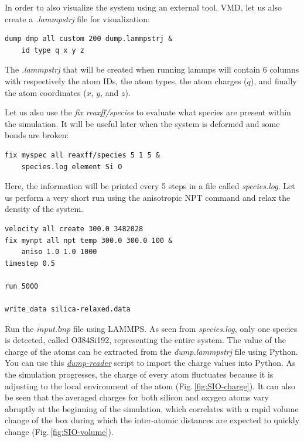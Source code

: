 \documentclass[9pt,tutorial]{livecoms}
\begin{document}
In order to also visualize the system using an external tool, VMD, let us also
create a \textit{.lammpstrj} file for visualization:
{\normalsize \begin{verbatim}
dump dmp all custom 200 dump.lammpstrj &
    id type q x y z
\end{verbatim}}
The \textit{.lammpstrj} that will be created when running lammps will contain
6 columns with respectively the atom IDs, the atom types, the atom charges ($q$),
and finally the atom coordinates ($x$, $y$, and $z$).

Let us also use the \textit{fix reaxff/species} to evaluate what species are
present within the simulation. It will be useful later when the system is deformed
and some bonds are broken:
{\normalsize \begin{verbatim}
fix myspec all reaxff/species 5 1 5 &
    species.log element Si O
\end{verbatim}}
Here, the information will be printed every 5 steps in a file called \textit{species.log}.
Let us perform a very short run using the anisotropic NPT command and relax the
density of the system.
{\normalsize \begin{verbatim}
velocity all create 300.0 3482028
fix mynpt all npt temp 300.0 300.0 100 &
    aniso 1.0 1.0 1000
timestep 0.5

run 5000

write_data silica-relaxed.data
\end{verbatim}}
Run the \textit{input.lmp} file using LAMMPS. As seen from \textit{species.log},
only one species is detected, called O384Si192, representing the entire system.
The value of the charge of the atoms can be extracted from the \textit{dump.lammpstrj}
file using Python. You can use this
\href{https://raw.githubusercontent.com/lammpstutorials/lammpstutorials-article/main/files/tutorial5/dump-reader.py}{\textit{dump-reader}}
script to import the charge values into Python.
As the simulation progresses, the charge of every atom fluctuates
because it is adjusting to the local environment of the atom (Fig.\,\ref{fig:SIO-charge}).
It can also be seen that the averaged charges for both silicon and oxygen
atoms vary abruptly at the beginning of the simulation, which correlates with
a rapid volume change of the box during which the inter-atomic distances are
expected to quickly change (Fig.\,\ref{fig:SIO-volume}).
\end{document}

